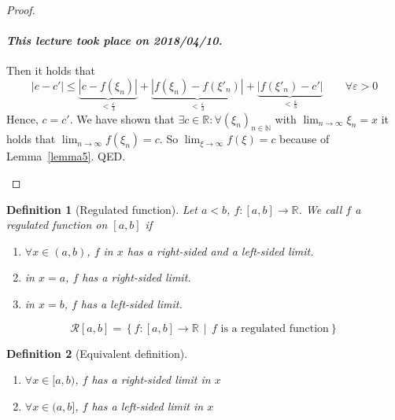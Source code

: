 \documentclass{article}
\newtheorem{definition}{Definition}  \numberwithin{definition}{section}
\newcommand{\setdef}[2]{\left\{\left.#1\,\middle|\,#2\right.\right\}}
\newcommand{\card}[1]{\left|#1\right|}
\newcommand{\dateref}[1]{\paragraph{\textit{This lecture took place on #1.}}}
\begin{document}
\begin{proof}
\begin{description}
      \dateref{2018/04/10}

      Then it holds that
      \[ \card{c - c'} \leq \underbrace{\card{c - f(\xi_n)}}_{< \frac\varepsilon3} + \underbrace{\card{f(\xi_n) - f(\xi'_n)}}_{< \frac\varepsilon3} + \underbrace{\card{f(\xi'_n) - c'}}_{< \frac\varepsilon3} \qquad \forall \varepsilon > 0 \]
      Hence, $c = c'$.
      We have shown that $\exists c \in \mathbb R: \forall (\xi_n)_{n \in \mathbb N}$ with $\lim_{n\to\infty} \xi_n = x$ it holds that
      $\lim_{n\to\infty} f(\xi_n) = c$. So $\lim_{\xi\to\infty} f(\xi) = c$ because of Lemma~\ref{lemma5}. QED.
  \end{description}
\end{proof}

\begin{definition}[Regulated function] %
  Let $a < b$, $f: [a,b] \to \mathbb R$. We call $f$ a \emph{regulated function on $[a,b]$} if
  \begin{enumerate}
    \item $\forall x \in (a,b)$, $f$ in $x$ has a right-sided and a left-sided limit.
    \item in $x = a$, $f$ has a right-sided limit.
    \item in $x = b$, $f$ has a left-sided limit.
  \end{enumerate}

  \[ \mathcal R[a,b] = \setdef{f: [a,b] \to \mathbb R}{f \text{ is a regulated function}} \]
\end{definition}

\begin{definition}[Equivalent definition]
  \begin{enumerate}
    \item $\forall x \in [a,b)$, $f$ has a right-sided limit in $x$
    \item $\forall x \in (a,b]$, $f$ has a left-sided limit in $x$
  \end{enumerate}
\end{definition}
\end{document}
